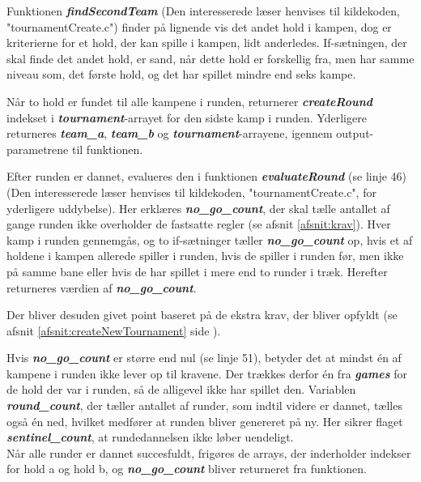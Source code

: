 \clearpage
Funktionen \textbf{\textit{findSecondTeam}} (Den interesserede læser henvises til kildekoden, "tournamentCreate.c") finder på lignende vis det andet hold i kampen, dog er kriterierne for et hold, der kan spille i kampen, lidt anderledes. If-sætningen, der skal finde det andet hold, er sand, når dette hold er forskellig fra, men har samme niveau som, det første hold, og det har spillet mindre end seks kampe.
\par
Når to hold er fundet til alle kampene i runden, returnerer \textbf{\textit{createRound}} indekset i \textbf{\textit{tournament}}-arrayet for den sidste kamp i runden. Yderligere returneres \textbf{\textit{team\_a}}, \textbf{\textit{team\_b}} og \textbf{\textit{tournament}}-arrayene, igennem output-parametrene til funktionen.
\par
Efter runden er dannet, evalueres den i funktionen \textbf{\textit{evaluateRound}} (se linje 46)(Den interesserede læser henvises til kildekoden, "tournamentCreate.c", for yderligere uddybelse). Her erklæres \textbf{\textit{no\_go\_count}}, der skal tælle antallet af gange runden ikke overholder de fastsatte regler (se afsnit \ref{afsnit:krav}). Hver kamp i runden gennemgås, og to if-sætninger tæller \textbf{\textit{no\_go\_count}} op, hvis et af holdene i kampen allerede spiller i runden, hvis de spiller i runden før, men ikke på samme bane eller hvis de har spillet i mere end to runder i træk. Herefter returneres værdien af \textbf{\textit{no\_go\_count}}.
\par
Der bliver desuden givet point baseret på de ekstra krav, der bliver opfyldt (se afsnit \ref{afsnit:createNewTournament} side \pageref{afsnit:createNewTournament}).
\par
Hvis \textbf{\textit{no\_go\_count}} er større end nul (se linje 51), betyder det at mindst én af kampene i runden ikke lever op til kravene. Der trækkes derfor én fra \textbf{\textit{games}} for de hold der var i runden, så de alligevel ikke har spillet den. Variablen \textbf{\textit{round\_count}}, der tæller antallet af runder, som indtil videre er dannet, tælles også én ned, hvilket medfører at runden bliver genereret på ny. Her sikrer flaget \textbf{\textit{sentinel\_count}}, at rundedannelsen ikke løber uendeligt. \\
Når alle runder er dannet succesfuldt, frigøres de arrays, der inderholder indekser for hold a og hold b, og \textbf{\textit{no\_go\_count}} bliver returneret fra funktionen. 

